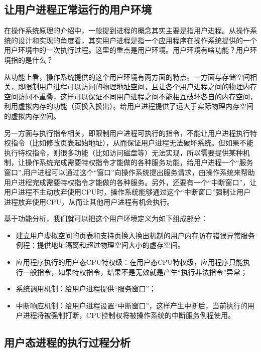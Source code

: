\subsection{让用户进程正常运行的用户环境}\label{ux8ba9ux7528ux6237ux8fdbux7a0bux6b63ux5e38ux8fd0ux884cux7684ux7528ux6237ux73afux5883}

在操作系统原理的介绍中，一般提到进程的概念其实主要是指用户进程。从操作系统的设计和实现的角度看，其实用户进程是指一个应用程序在操作系统提供的一个用户环境中的一次执行过程。这里的重点是用户环境。用户环境有啥功能？用户环境指的是什么？

从功能上看，操作系统提供的这个用户环境有两方面的特点。一方面与存储空间相关，即限制用户进程可以访问的物理地址空间，且让各个用户进程之间的物理内存空间访问不重叠，这样可以保证不同用户进程之间不能相互破坏各自的内存空间，利用虚拟内存的功能（页换入换出）。给用户进程提供了远大于实际物理内存空间的虚拟内存空间。

另一方面与执行指令相关，即限制用户进程可执行的指令，不能让用户进程执行特权指令（比如修改页表起始地址），从而保证用户进程无法破坏系统。但如果不能执行特权指令，则很多功能（比如访问磁盘等）无法实现，所以需要提供某种机制，让操作系统完成需要特权指令才能做的各种服务功能，给用户进程一个``服务窗口'',用户进程可以通过这个``窗口''向操作系统提出服务请求，由操作系统来帮助用户进程完成需要特权指令才能做的各种服务。另外，还要有一个``中断窗口''，让用户进程不主动放弃使用CPU时，操作系统能够通过这个``中断窗口''强制让用户进程放弃使用CPU，从而让其他用户进程有机会执行。

基于功能分析，我们就可以把这个用户环境定义为如下组成部分：

\begin{itemize}
\item
  建立用户虚拟空间的页表和支持页换入换出机制的用户内存访存错误异常服务例程：提供地址隔离和超过物理空间大小的虚存空间。
\item
  应用程序执行的用户态CPU特权级：在用户态CPU特权级，应用程序只能执行一般指令，如果特权指令，结果不是无效就是产生``执行非法指令''异常；
\item
  系统调用机制：给用户进程提供``服务窗口''；
\item
  中断响应机制：给用户进程设置``中断窗口''，这样产生中断后，当前执行的用户进程将被强制打断，CPU控制权将被操作系统的中断服务例程使用。
\end{itemize}

\subsection{用户态进程的执行过程分析}\label{ux7528ux6237ux6001ux8fdbux7a0bux7684ux6267ux884cux8fc7ux7a0bux5206ux6790}

